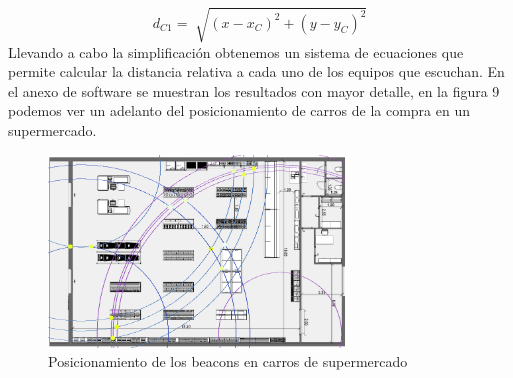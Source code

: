 \documentclass[a4paper ,12pt, onecolumn]{article}
\begin{document}
                \begin{equation}
                    d_{C1}= \sqrt[]{(x-x_C)^2+(y-y_C)^2}
                \end{equation}
                Llevando a cabo la simplificación obtenemos un sistema de ecuaciones que permite calcular la distancia
                relativa a cada uno de los equipos que escuchan. En el anexo de software se muestran los resultados con mayor 
                detalle, en la figura 9 podemos ver un adelanto del posicionamiento de carros de la compra en un supermercado.
                \begin{center}
                    \begin{figure}[h]
                        \centering
                        \includegraphics[width=0.7\textwidth]{agrupation_3.PNG}
                        \caption{Posicionamiento de los beacons en carros de supermercado}
                        \label{fig:mesh7}
                    \end{figure}
                \end{center}
                \paragraph{}
\end{document}
